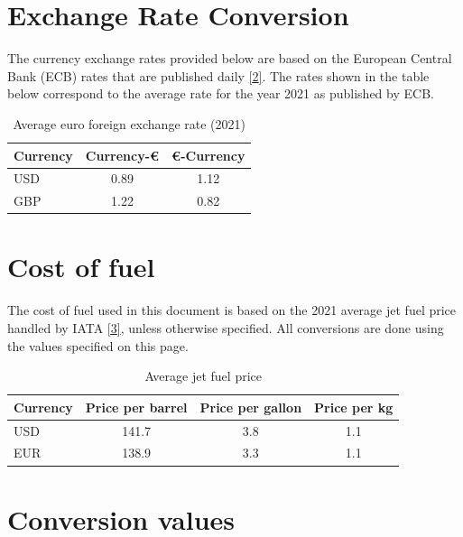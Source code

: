 \documentclass[
  11pt,
  a4paper,
]{book}
\begin{document}
\hypertarget{exchange-rates}{%
\section*{Exchange Rate Conversion}\label{exchange-rates}}


The currency exchange rates provided below are based on the European
Central Bank (ECB) rates that are published daily
\protect\hyperlink{ref-ECB:exchange_rates}{{[}2{]}}. The rates shown in
the table below correspond to the average rate for the year 2021 as
published by ECB.

\hypertarget{tbl-eurostat-exchange-rates}{}
\begin{longtable}{lcc}
\caption{\label{tbl-eurostat-exchange-rates}Average euro foreign exchange rate (2021) }\tabularnewline

\toprule
Currency & Currency-€ & €-Currency \\ 
\midrule
USD & 0.89 & 1.12 \\ 
GBP & 1.22 & 0.82 \\ 
\bottomrule
\end{longtable}

\hypertarget{cost-of-fuel}{%
\section*{Cost of fuel}\label{cost-of-fuel}}


The cost of fuel used in this document is based on the 2021 average jet
fuel price handled by IATA
\protect\hyperlink{ref-iata:JetFuelPrice}{{[}3{]}}, unless otherwise
specified. All conversions are done using the values specified on this
page.

\hypertarget{tbl-cost-of-fuel}{}
\begin{longtable}{lccc}
\caption{\label{tbl-cost-of-fuel}Average jet fuel price }\tabularnewline

\toprule
Currency & Price per barrel & Price per gallon & Price per kg \\ 
\midrule
USD & 141.7 & 3.8 & 1.1 \\ 
EUR & 138.9 & 3.3 & 1.1 \\ 
\bottomrule
\end{longtable}

\hypertarget{conversion-values}{%
\section*{Conversion values}\label{conversion-values}}
\end{document}
